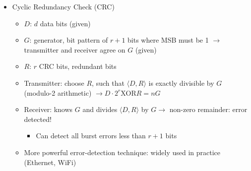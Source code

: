 \begin{itemize}
\begin{itemize}
      \item Cyclic Redundancy Check (CRC)

        \begin{itemize}

          \item $D$: $d$ data bits (given)

          \item $G$: generator, bit pattern of $r+1$ bits where MSB must be 1 $\to$ transmitter and receiver agree on $G$ (given)

          \item $R$: $r$ CRC bits, redundant bits

          \item Transmitter: choose $R$, such that $\langle D,R\rangle$ is exactly divisible by $G$ (modulo-2 arithmetic) $\to D\cdot2^r\text{XOR}R=nG$

          \item Receiver: knows $G$ and divides $\langle D,R\rangle$ by $G\to$ non-zero remainder: error detected!

            \begin{itemize}

              \item Can detect all burst errors less than $r+1$ bits

            \end{itemize}

          \item More powerful error-detection technique: widely used in practice (Ethernet,  WiFi)

        \end{itemize}

    \end{itemize}

\end{itemize}



